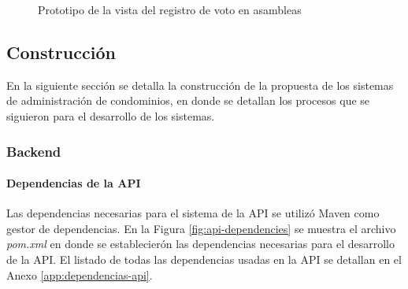 \begin{figure}[H]
    \centering
    \caption{Prototipo de la vista del registro de voto en asambleas}
    \label{fig:perfil-movil}
\end{figure}

\subsection{Construcción}\label{subsec:construccion}
En la siguiente sección se detalla la construcción de la propuesta de los sistemas de administración de condominios, en donde se detallan los procesos que se siguieron para el desarrollo de los sistemas.
\subsubsection{Backend}

\paragraph{Dependencias de la API}

Las dependencias necesarias para el sistema de la API se utilizó Maven como gestor de dependencias.
En la Figura \ref{fig:api-dependencies} se muestra el archivo \textit{pom.xml} en donde se establecierón las dependencias necesarias para el desarrollo de la API.
El listado de todas las dependencias usadas en la API se detallan en el Anexo \ref{app:dependencias-api}.


